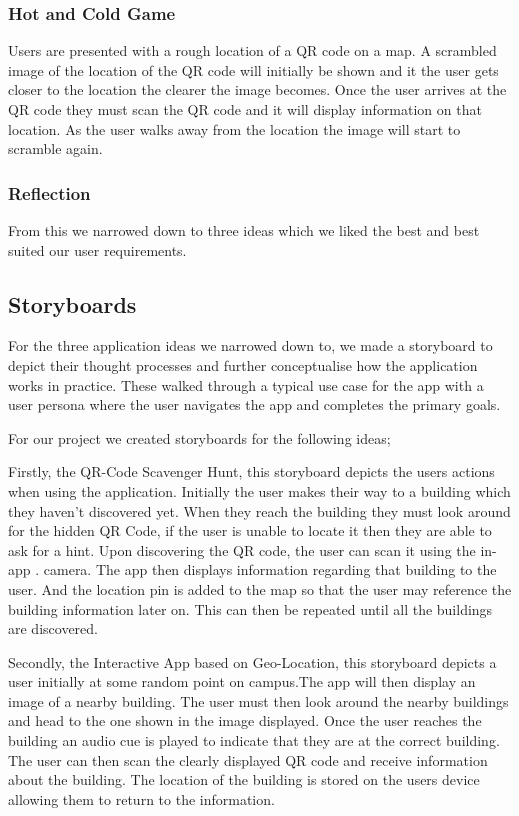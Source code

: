 \documentclass[a4,10pt,twocolumn]{article}
\begin{document}
\subsubsection{Hot and Cold Game}
Users are presented with a rough location of a QR code on a map. A scrambled image of the location of the QR code will initially be shown and it the user gets closer to the location the clearer the image becomes. Once the user arrives at the QR code they must scan the QR code and it will display information on that location. As the user walks away from the location the image will start to scramble again.

\subsubsection{Reflection}
From this we narrowed down to three ideas which we liked the best and best suited our user requirements. 

\subsection{Storyboards}
For the three application ideas we narrowed down to, we made a storyboard to depict their thought processes and further conceptualise how the application works in practice. These walked through a typical use case for the app with a user persona where the user navigates the app and completes the primary goals.

For our project we created storyboards for the following ideas;

Firstly, the QR-Code Scavenger Hunt, this storyboard depicts the users actions when using the application. Initially the user makes their way to a building which they haven't discovered yet. When they reach the building they must look around for the hidden QR Code, if the user is unable to locate it then they are able to ask for a hint. Upon discovering the QR code, the user can scan it using the in-app . camera. The app then displays information regarding that building to the user. And the location pin is added to the map so that the user may reference the building information later on. This can then be repeated until all the buildings are discovered.

Secondly, the Interactive App based on Geo-Location, this storyboard depicts a user initially at some random point on campus.The app will then display an image of a nearby building. The user must then look around the nearby buildings and head to the one shown in the image displayed. Once the user reaches the building an audio cue is played to indicate that they are at the correct building. The user can then scan the clearly displayed QR code and receive information about the building. The location of the building is stored on the users device allowing them to return to the information.
\end{document}
